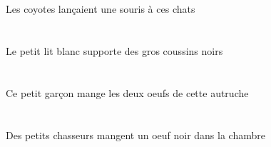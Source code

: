 \begin{exe}
\DEFPlErgP{}   \coyoteAPlErgP{}    \DEMPlDatP{}   \chatDPlDatP{}   \INDSgAbsP{}   \sourisASgAbsP{}  \lancerVdPstASgP{}\\
\DEFPlErgG{}   \coyoteAPlErgG{}    \DEMPlDatG{}   \chatDPlDatG{}   \INDSgAbsG{}   \sourisASgAbsG{}  \lancerVdPstASgG{}\\
Les coyotes lançaient une souris à ces chats
\ex\glll
\DEFSgErg{}   \petitDSg{}   \blancDSg{}   \litDSgErg{}   \INDPlAbs{}   \grosAPl{}   \noirAPl{}   \coussinAPlAbs{}  \supporterVtPrsAPl{}\\
\DEFSgErgP{}   \petitDSgP{}   \blancDSgP{}   \litDSgErgP{}   \INDPlAbsP{}   \grosAPlP{}   \noirAPlP{}   \coussinAPlAbsP{}  \supporterVtPrsAPlP{}\\
\DEFSgErgG{}   \petitDSgG{}   \blancDSgG{}   \litDSgErgG{}   \INDPlAbsG{}   \grosAPlG{}   \noirAPlG{}   \coussinAPlAbsG{}  \supporterVtPrsAPlG{}\\
Le petit lit blanc supporte des gros coussins noirs
\ex\glll
\DEMSgErg{}   \petitBSg{}   \garconBSgErg{}   \DEFDuAbs{}    \DEMSgObl{}   \autrucheDSgObl{}   \DE{}   \oeufDDuAbs{}  \mangerVtPrsDDu{}\\
\DEMSgErgP{}   \petitBSgP{}   \garconBSgErgP{}   \DEFDuAbsP{}    \DEMSgOblP{}   \autrucheDSgOblP{}   \DEP{}   \oeufDDuAbsP{}  \mangerVtPrsDDuP{}\\
\DEMSgErgG{}   \petitBSgG{}   \garconBSgErgG{}   \DEFDuAbsG{}    \DEMSgOblG{}   \autrucheDSgOblG{}   \DEG{}   \oeufDDuAbsG{}  \mangerVtPrsDDuG{}\\
Ce petit garçon mange les deux oeufs de cette autruche
\ex\glll
\DEFSgObl{}   \chambreBSgObl{}   \DANS{}   \INDPlErg{}   \petitCPl{}   \chasseurCPlErg{}   \INDSgAbs{}   \noirDSg{}   \oeufDSgAbs{}  \mangerVtPrsDSg{}\\
\DEFSgOblP{}   \chambreBSgOblP{}   \DANSP{}   \INDPlErgP{}   \petitCPlP{}   \chasseurCPlErgP{}   \INDSgAbsP{}   \noirDSgP{}   \oeufDSgAbsP{}  \mangerVtPrsDSgP{}\\
\DEFSgOblG{}   \chambreBSgOblG{}   \DANSG{}   \INDPlErgG{}   \petitCPlG{}   \chasseurCPlErgG{}   \INDSgAbsG{}   \noirDSgG{}   \oeufDSgAbsG{}  \mangerVtPrsDSgG{}\\
Des petits chasseurs mangent un oeuf noir dans la chambre
\ex\glll
\DEMDuObl{}   \maisonDDuObl{}   \DEVANT{}   \INDDuErg{}   \autrucheDDuErg{}   \INDPlAbs{}   \fruitBPlAbs{}  \mangerVtPstBPl{}\\
\DEMDuOblP{}   \maisonDDuOblP{}   \DEVANTP{}   \INDDuErgP{}   \autrucheDDuErgP{}   \INDPlAbsP{}   \fruitBPlAbsP{}  \mangerVtPstBPlP{}\\

\end{exe}
